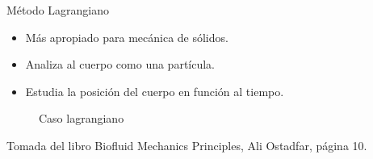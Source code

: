 \begin{frame}{Método Lagrangiano}
\justifying
\begin{itemize}
\item Más apropiado para mecánica de sólidos.
\item Analiza al cuerpo como una partícula.
\item Estudia la posición del cuerpo en función al tiempo.
\end{itemize}
\begin{figure}
\centering
{}
\caption{Caso lagrangiano}
\label{f:casolagrangiano}
\end{figure}			
{\tiny Tomada del libro Biofluid Mechanics Principles, Ali Ostadfar, página 10.}
\end{frame}	

